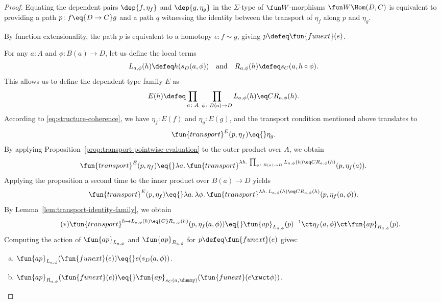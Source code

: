 \begin{proof}
    Equating the dependent pairs $\dep{f,\eta_f}$ and $\dep{g,\eta_g}$ in the $\Sigma$-type of $\fun W$-morphisms $\fun W\Hom(D,C)$ is equivalent to providing a path $p\colon f\eq{D\to C}g$ and a path $q$ witnessing the identity between the transport of $\eta_f$ along $p$ and $\eta_g$.
    
    By function extensionality, the path $p$ is equivalent to a homotopy $e\colon f\sim g$, giving $p\defeq\fun{funext}(e)$.
    
    For any $a\colon A$ and $\phi\colon B(a)\to D$, let us define the local terms
    \[
        L_{a,\phi}(h)\defeq h(s_D(a,\phi))
            \quad\text{and}\quad
        R_{a,\phi}(h)\defeq s_C(a,h\circ\phi).
    \]
    This allows us to define the dependent type family $E$ as
    \[
        E(h)\defeq
            \prod_{a\colon A}\;
            \prod_{\phi\colon B(a)\to D}
                L_{a,\phi}(h)\eq CR_{a,\phi}(h).
    \]
    According to \eqref{eq:structure-coherence}, we have $\eta_f\colon E(f)$ and $\eta_g\colon E(g)$, and the transport condition mentioned above translates to
    \[
        \fun{transport}^E(p,\eta_f)\eq{}\eta_g.
    \]
    By applying Proposition~\ref{prop:transport-pointwise-evaluation} to the outer product over $A$, we obtain
    \[
        \fun{transport}^E(p,\eta_f)
        \eq{}
        \lambda a.\,\fun{transport}^{
            \lambda h.\,\prod_{\phi\colon B(a)\to D}
                L_{a,\phi}(h)\eq CR_{a,\phi}(h)
            }
            (p,\eta_f(a)).
    \]
    Applying the proposition a second time to the inner product over $B(a)\to D$ yields
    \[
        \fun{transport}^E(p,\eta_f)\eq{}
        \lambda a.\,\lambda \phi.\, 
            \fun{transport}^{
                \lambda h.\,L_{a,\phi}(h)
                \eq CR_{a,\phi}(h)
            }
            (p,\eta_f(a,\phi)).
    \]
    By Lemma~\ref{lem:transport-identity-family}, we obtain
    \[\tag{$\ast$}
        \fun{transport}^{h \mapsto L_{a,\phi}(h) \eq{C} R_{a,\phi}(h)}(p, \eta_f(a,\phi)) 
        \eq{} \fun{ap}_{L_{a,\phi}}(p)^{-1} \ct \eta_f(a,\phi) \ct \fun{ap}_{R_{a,\phi}}(p).
    \]
    Computing the action of $\fun{ap}_{L_{a,\phi}}$ and $\fun{ap}_{R_{a,\phi}}$ for $p\defeq\fun{funext}(e)$ gives:
    \begin{enumerate}[a),font=\upshape]
        \item $\fun{ap}_{L_{a,\phi}}(\fun{funext}(e))\eq{} e(s_D(a,\phi))$.
        \item $\fun{ap}_{R_{a,\phi}}(\fun{funext}(e))\eq{} \fun{ap}_{s_C(a,\dummy)}(\fun{funext}(e\rwct\phi))$.

\end{enumerate}
\end{proof}
